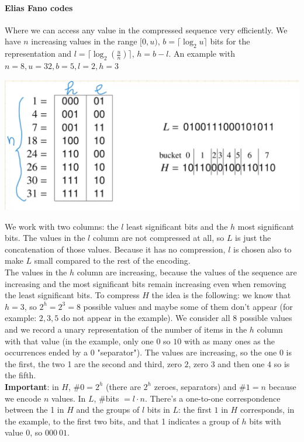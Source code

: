 \documentclass[10pt]{report}
\begin{document}
\paragraph{Elias Fano codes} Where we can access any value in the compressed sequence very efficiently. We have $n$ increasing values in the range $[0, u)$, $b = \lceil\log_2 u\rceil$ bits for the representation and $l = \lceil\log_2(\frac{u}{n})\rceil$, $h = b-l$. An example with $n = 8, u = 32, b = 5, l = 2, h = 3$
\begin{center}
	\includegraphics[scale=0.5]{12.png}
\end{center}
We work with two columns: the $l$ least significant bits and the $h$ most significant bits. The values in the $l$ column are not compressed at all, so $L$ is just the concatenation of those values. Because it has no compression, $l$ is chosen also to make $L$ small compared to the rest of the encoding.\\
The values in the $h$ column are increasing, because the values of the sequence are increasing and the most significant bits remain increasing even when removing the least significant bits. To compress $H$ the idea is the following: we know that $h=3$, so $2^h = 2^3 = 8$ possible values and maybe some of them don't appear (for example: $2,3,5$ do not appear in the example). We consider all 8 possible values and we record a unary representation of the number of items in the $h$ column with that value (in the example, only one $0$ so $10$ with as many ones as the occurrences ended by a $0$ "separator"). The values are increasing, so the one 0 is the first, the two 1 are the second and third, zero $2$, zero $3$ and then one $4$ so is the fifth.\\
\textbf{Important}: in $H$, $\#0 = 2^h$ (there are $2^h$ zeroes, separators) and $\#1 = n$ because we encode $n$ values. In $L$, \#bits $= l\cdot n$. There's a one-to-one correspondence between the 1 in $H$ and the groups of $l$ bits in $L$: the first $1$ in $H$ corresponds, in the example, to the first two bits, and that 1 indicates a group of $h$ bits with value 0, so $000\:01$.
\end{document}
